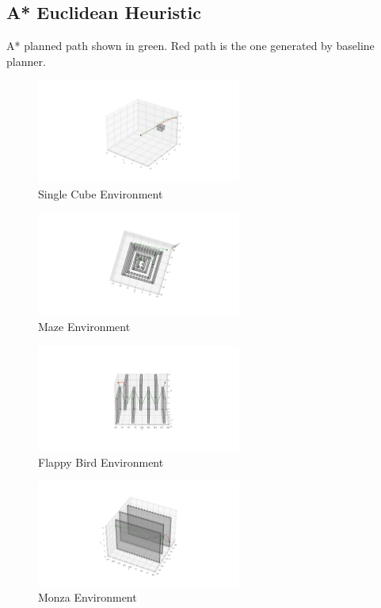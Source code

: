 \documentclass[conference]{IEEEtran}
\begin{document}
\subsection{A* Euclidean Heuristic}
A* planned path shown in green. Red path is the one generated by baseline planner.
\begin{figure}[H]
    \centering
    \includegraphics[width=0.6\textwidth]{cube_astar.png}
    \caption{Single Cube Environment}
    \label{fig:cube_astar}
\end{figure}
\begin{figure}[H]
    \centering
    \includegraphics[width=0.6\textwidth]{maze_astar.png}
    \caption{Maze Environment}
    \label{fig:maze_astar}
\end{figure}
\begin{figure}[H]
    \centering
    \includegraphics[width=0.6\textwidth]{flappy_bird_astar.png}
    \caption{Flappy Bird Environment}
    \label{fig:flappy_bird_astar}
\end{figure}
\begin{figure}[H]
    \centering
    \includegraphics[width=0.6\textwidth]{monza_astar.png}
    \caption{Monza Environment}
    \label{fig:monza_astar}
\end{figure}
\end{document}
